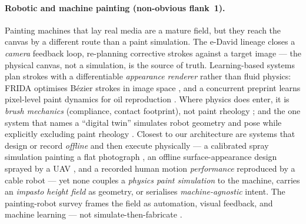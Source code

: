 \documentclass[11pt]{article}
\begin{document}
\paragraph{Robotic and machine painting (non-obvious flank~1).}
Painting machines that lay real media are a mature field, but they reach the
canvas by a different route than a paint simulation. The e-David lineage closes a
\emph{camera} feedback loop, re-planning corrective strokes against a target image
\citep{deussen2012edavid,lindemeier2015edavid} --- the physical canvas, not a
simulation, is the source of truth. Learning-based systems plan strokes with a
differentiable \emph{appearance renderer} rather than fluid physics: FRIDA
optimises B\'{e}zier strokes in image space \citep{schaldenbrand2023frida}, and a
concurrent preprint learns pixel-level paint dynamics for oil reproduction
\citep{wang2026impasto}. Where physics does enter, it is \emph{brush mechanics}
(compliance, contact footprint), not paint rheology \citep{karimov2024brush}; and
the one system that names a ``digital twin'' simulates robot geometry and pose
while explicitly excluding paint rheology \citep{chancharoen2022twin}. Closest to
our architecture are systems that design or record \emph{offline} and then execute
physically --- a calibrated spray simulation painting a flat photograph
\citep{prevost2016painting}, an offline surface-appearance design sprayed by a UAV
\citep{vempati2018paintcopter}, and a recorded human motion \emph{performance}
reproduced by a cable robot \citep{chen2022gtgraffiti} --- yet none couples a
\emph{physics paint simulation} to the machine, carries an \emph{impasto height
field} as geometry, or serialises \emph{machine-agnostic} intent. The
painting-robot survey frames the field as automation, visual feedback, and machine
learning --- not simulate-then-fabricate \citep{gulzow2020survey}.
\end{document}
